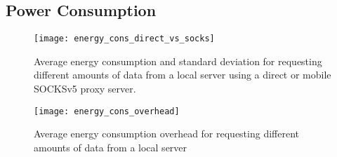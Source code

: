 \subsection*{Power Consumption}

\begin{figure}
\centering
\texttt{[image: energy\_cons\_direct\_vs\_socks]}
\caption{Average energy consumption and standard deviation for requesting different amounts of data from a local server using a direct or mobile SOCKSv5 proxy server.}
\label{fig:energy_cons_direct_vs_socks}
\end{figure}

\begin{figure}
\centering
\texttt{[image: energy\_cons\_overhead]}
\caption{Average energy consumption overhead for requesting different
amounts of data from a local server}
\label{fig:energy_cons_overhead}
\end{figure}

